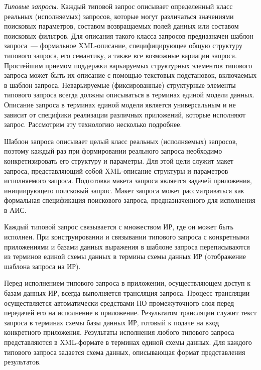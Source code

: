 \begin{multicols}{2}
      
      \textit{Типовые запросы.} Каждый типовой запрос описывает определенный класс 
реальных (ис\-пол\-ня\-емых) запросов, которые могут различаться\linebreak
 значениями поисковых 
параметров, составом возвращаемых полей данных или составом поисковых фильтров. Для 
описания такого класса запросов предназначен шаблон запроса~--- формальное 
      XML-описание, специфицирующее общую структуру\linebreak
       типового запроса, его семантику, 
а также все возможные вариации запроса. Простейшим при\-емом поддержки варьируемых 
структурных элементов типового запроса может быть их описание с по\-мощью текстовых 
подстановок, включаемых в шаблон запроса. Неварьируемые (фиксированные) структурные 
элементы типового запроса всегда должны описываться в терминах единой модели данных. 
Описание запроса в терминах единой модели является универсальным и не зависит от 
специфики реализации различных приложений, которые исполняют запрос. Рассмотрим эту 
технологию несколько подробнее.
      
      Шаблон запроса описывает целый класс реальных (исполняемых) запросов, поэтому 
каждый раз при формировании реального запроса необходимо конкретизировать его 
структуру и параметры. Для этой цели служит макет запроса, пред\-став\-ля\-ющий собой 
      XML-описание структуры и параметров исполняемого запроса. Подготовка макета 
запроса является задачей приложения, инициирующего поисковый запрос. Макет запроса 
может рассматриваться как формальная спецификация поискового запроса, предназначенного 
для исполнения в АИС.
      
      Каждый типовой запрос связывается с множеством ИР, где он может быть исполнен. 
При конструировании и связывании типового запроса с конкретными приложениями и базами 
данных выражения в шаблоне запроса переписываются из терминов единой схемы данных в 
термины схемы данных ИР (отображение шаблона запроса на ИР). 
      
      Перед исполнением типового запроса в приложении, осуществляющем доступ к базам 
данных ИР, всегда выполняется трансляция запроса. Процесс трансляции осуществляется 
автоматически средствами ПО промежуточного слоя перед передачей его на исполнение в 
приложение. Результатом трансляции служит текст запроса в терминах схемы базы данных 
ИР, готовый к подаче на вход конкретного приложения. Результаты исполнения любого 
типового запроса представляются в XML-фор\-ма\-те в терминах единой схемы данных. Для 
каждого типового запроса задается схема данных, описывающая формат представления 
результатов. 


\end{multicols}
